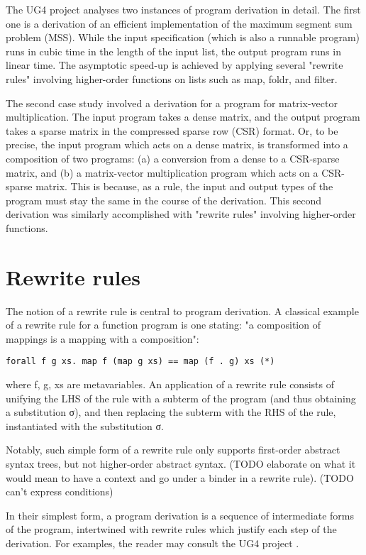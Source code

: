 \documentclass[bsc,frontabs,twoside,singlespacing,parskip,deptreport]{infthesis}
\theoremstyle{definition}
\begin{document}
The UG4 project analyses two instances of program derivation in
detail. The first one is a derivation of an efficient implementation
of the maximum segment sum problem (MSS). While the input
specification (which is also a runnable program) runs in cubic time in
the length of the input list, the output program runs in linear
time. The asymptotic speed-up is achieved by applying several "rewrite
rules" involving higher-order functions on lists such as map, foldr,
and filter.

The second case study involved a derivation for a program for
matrix-vector multiplication. The input program takes a dense matrix,
and the output program takes a sparse matrix in the compressed sparse
row (CSR) format. Or, to be precise, the input program which acts on a
dense matrix, is transformed into a composition of two programs: (a) a
conversion from a dense to a CSR-sparse matrix, and (b) a
matrix-vector multiplication program which acts on a CSR-sparse
matrix. This is because, as a rule, the input and output types of the
program must stay the same in the course of the derivation. This
second derivation was similarly accomplished with "rewrite rules"
involving higher-order functions.

\section{Rewrite rules}
\label{sec:rewrite-rules}

The notion of a rewrite rule is central to program derivation. A
classical example of a rewrite rule for a function program is one
stating: "a composition of mappings is a mapping with a composition":

\begin{verbatim}
forall f g xs. map f (map g xs) == map (f . g) xs (*)
\end{verbatim}

where f, g, xs are metavariables. An application of a rewrite rule
consists of unifying the LHS of the rule with a subterm of the program
(and thus obtaining a substitution σ), and then replacing the
subterm with the RHS of the rule, instantiated with the substitution
σ.

Notably, such simple form of a rewrite rule only supports first-order
abstract syntax trees, but not higher-order abstract syntax. (TODO
elaborate on what it would mean to have a context and go under a
binder in a rewrite rule). (TODO can't express conditions)

In their simplest form, a program derivation is a sequence of
intermediate forms of the program, intertwined with rewrite rules
which justify each step of the derivation. For examples, the reader
may consult the UG4 project \cite{TODO}.
\end{document}
